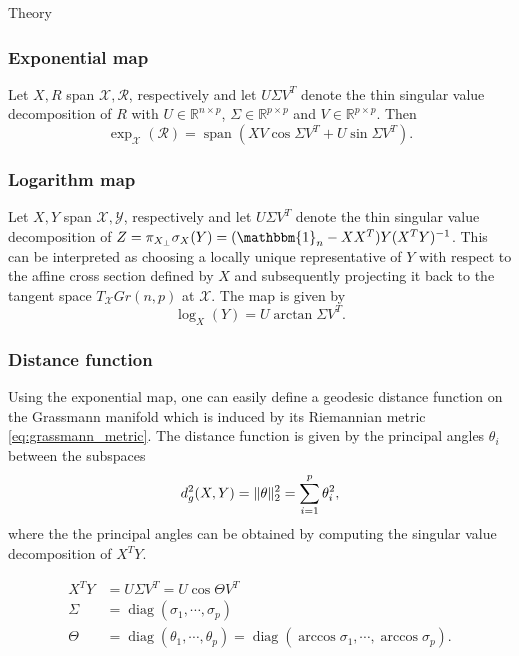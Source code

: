 \begin{chapter}{Theory}
\subsubsection{Exponential map} %
\label{ssub:Exponential map}
Let $X, R$ span $\mathcal{X}, \mathcal{R}$, respectively and let $U\Sigma V^{T}$ denote the thin singular value decomposition of $R$ with $U\in\mathbb{R}^{n\times p}$, $\Sigma\in\mathbb{R}^{p\times p}$
and $V\in\mathbb{R}^{p\times p}$. Then
\begin{equation}
    \exp_{\mathcal{X}}(\mathcal{R})=\operatorname{span}\left( XV\cos\Sigma V^T + U\sin\Sigma V^T\right).
\end{equation}

\subsubsection{Logarithm map} %
\label{ssub:Logarithm map}
Let $X, Y$ span $\mathcal{X}, \mathcal{Y}$, respectively and let $U\Sigma V^{T}$ denote the thin singular value decomposition of $Z=\pi_{X_{\bot}}\sigma_X(Y)=(\mathbbm{1}_n-XX^T)Y(X^TY)^{-1}$.
This can be interpreted as choosing a locally unique representative of $Y$ with respect to the affine cross section defined by $X$ and subsequently projecting it back to the tangent space $T_{\mathcal{X}}Gr(n,p)$ at $\mathcal{X}$. 
The map is given by
\begin{equation} 
\log_X(Y) = U\arctan\Sigma V^T. 
\end{equation}


\subsubsection{Distance function} %
\label{ssub:Distance function}
Using the exponential map, one can easily define a geodesic distance function on the Grassmann manifold which is induced by its Riemannian metric \ref{eq:grassmann_metric}. The distance function is given by the principal angles $\theta_i$ between the subspaces 
\begin{equation}
    \label{eq:gr_geod_dist}
    d_g^2(X,Y) = \| \theta \|_2^2=\sum_{i=1}^p\theta_i^2,
\end{equation}
where the the principal angles can be obtained by computing the singular value decomposition of $X^TY$.

\begin{align}
    X^TY &= U\Sigma V^T = U\cos\Theta V^T\\
    \Sigma &= \operatorname{diag} (\sigma_1,\cdots,\sigma_p)\\
    \Theta &= \operatorname{diag} (\theta_1,\cdots,\theta_p) = \operatorname{diag} (\arccos\sigma_1,\cdots,\arccos\sigma_p).
\end{align}


\end{chapter}
